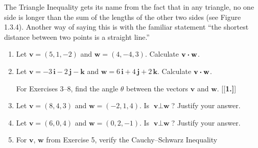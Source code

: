 \piccaption[]{}
\par The Triangle Inequality gets its name from the fact that in any triangle, no one side is longer than the sum of
the lengths of the other two sides (see Figure 1.3.4). Another way of saying this is with the familiar statement ``the
shortest distance between two points is a straight line.''

\vspace{-6mm}
\startexercises\label{sec1dot3}
\begin{enumerate}[\bfseries 1.]
 \item Let $\textbf{v} = (5,1,-2)$ and $\textbf{w} = (4,-4,3)$. Calculate $\textbf{v} \bm{\cdot} \textbf{w}$.
 \item Let $\textbf{v} = -3\,\textbf{i} - 2\,\textbf{j} - \textbf{k}$ and
  $\textbf{w} = 6\,\textbf{i} + 4\,\textbf{j} + 2\,\textbf{k}$. Calculate $\textbf{v} \bm{\cdot} \textbf{w}$.
\par\noindent For Exercises 3--8, find the angle $\theta$ between the vectors $\textbf{v}$ and $\textbf{w}$.
[{[\bfseries 1.]}]
 \item Let $\textbf{v} = (8,4,3)$ and $\textbf{w} = (-2,1,4)$. Is $\textbf{v} \perp \textbf{w}$? Justify your answer.
 \item Let $\textbf{v} = (6,0,4)$ and $\textbf{w} = (0,2,-1)$. Is $\textbf{v} \perp \textbf{w}$? Justify your answer.
 \item For $\textbf{v}$, $\textbf{w}$ from Exercise 5, verify the Cauchy--Schwarz Inequality

\end{enumerate}
